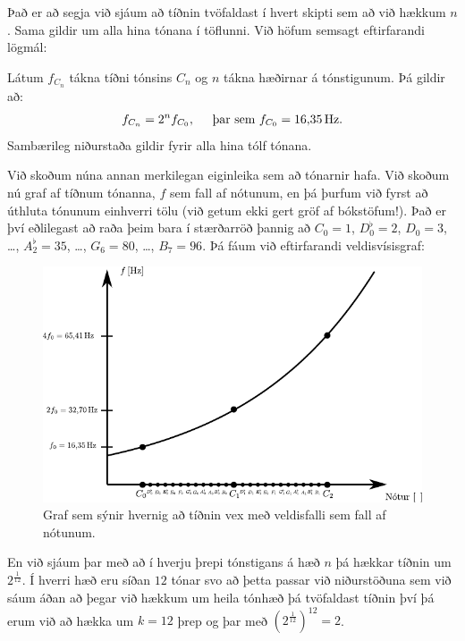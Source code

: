 Það er að segja við sjáum að tíðnin tvöfaldast í hvert skipti sem að við hækkum $n$. Sama gildir um alla hina tónana í töflunni. Við höfum semsagt eftirfarandi lögmál:

\begin{tcolorbox}
\begin{theorem}
Látum $f_{C_n}$ tákna tíðni tónsins $C_n$ og $n$ tákna hæðirnar á tónstigunum. Þá gildir að:
\begin{align*}
    f_{C_n} = 2^{n}f_{C_0}, \hspace{0.5cm} \text{þar sem $f_{C_0} = \SI{16.35}{Hz}$.}
\end{align*}
Sambærileg niðurstaða gildir fyrir alla hina tólf tónana.
\end{theorem}
\end{tcolorbox}

\newpage

Við skoðum núna annan merkilegan eiginleika sem að tónarnir hafa. Við skoðum nú graf af tíðnum tónanna, $f$ sem fall af nótunum, en þá þurfum við fyrst að úthluta tónunum einhverri tölu (við getum ekki gert gröf af bókstöfum!). Það er því eðlilegast að raða þeim bara í stærðarröð þannig að $C_0 = 1$, $D^\flat_0 = 2$, $D_0 = 3$, \ldots, $A^\flat_2 = 35$, \ldots, $G_6 = 80$, \ldots, $B_7 = 96$. Þá fáum við eftirfarandi veldisvísisgraf:

\begin{figure}[H]
    \centering
    \includegraphics{figures/music-notes.pdf}
    \caption{Graf sem sýnir hvernig að tíðnin vex með veldisfalli sem fall af nótunum.}
    \label{fig:my_label}
\end{figure}
En við sjáum þar með að í hverju þrepi tónstigans á hæð $n$ þá hækkar tíðnin um $2^{\frac{1}{12}}$. Í hverri hæð eru síðan $12$ tónar svo að þetta passar við niðurstöðuna sem við sáum áðan að þegar við hækkum um heila tónhæð þá tvöfaldast tíðnin því þá erum við að hækka um $k = 12$ þrep og þar með $\left(2^{\frac{1}{12}}\right)^{12} = 2$.

